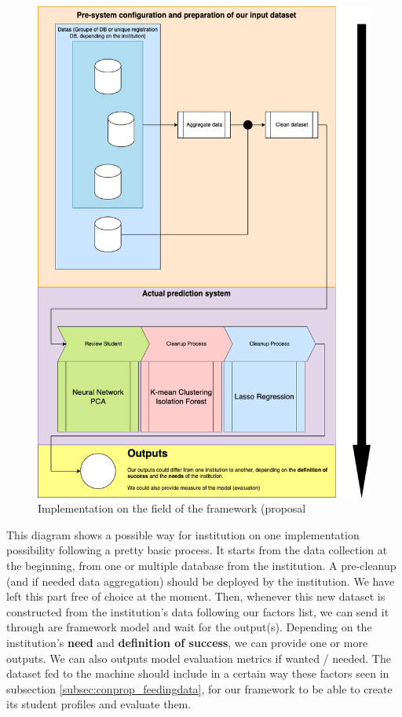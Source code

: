 \documentclass[../main.tex]{subfiles}
\begin{document}
\begin{figure}[H]
    \centering
    \includegraphics[width=1\linewidth]{res//diagram/Fonc imp.png}
    \caption{Implementation on the field of the framework (proposal}
    \label{fig:imp_fonc}
\end{figure}

This diagram shows a possible way for institution on one implementation possibility following a pretty basic process. It starts from the data collection at the beginning, from one or multiple database from the institution. A pre-cleanup (and if needed data aggregation) should be deployed by the institution. We have left this part free of choice at  the moment.
Then, whenever this new dataset is constructed from the institution's data following our factors list, we can send it through are framework model and wait for the output(s). Depending on the institution's \textbf{need} and \textbf{definition of success}, we can provide one or more outputs. We can also outputs model evaluation metrics if wanted / needed. 
The dataset fed to the machine should include in a certain way these factors seen in subsection \ref{subsec:conprop_feedingdata}, for our framework to be able to create its student profiles and evaluate them.
\end{document}

